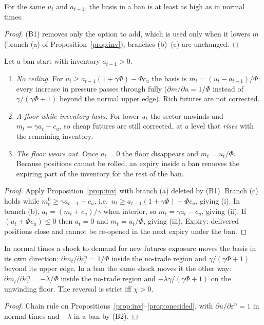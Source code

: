 \begin{lemma}\label{lem:weak}
For the same $u_t$ and $a_{t-1}$, the basis in a ban is at least as high as in normal times.
\end{lemma}
\begin{proof}
(B1) removes only the option to add, which is used only when it lowers $m$ (branch (a) of Proposition~\ref{prop:inv});
branches (b)--(c) are unchanged.
\end{proof}

\begin{proposition}\label{prop:onesided}
Let a ban start with inventory $a_{t-1}>0$.
\begin{enumerate}[label=(\roman*),leftmargin=1.8em,itemsep=1pt]
\item \emph{No ceiling.} For $u_t\ge a_{t-1}(1+\gamma\Phi)-\Phi c_u$ the basis is $m_t=(u_t-a_{t-1})/\Phi$: every increase
in pressure passes through fully ($\partial m/\partial u=1/\Phi$ instead of $\gamma/(\gamma\Phi+1)$ beyond the normal
upper edge). Rich futures are not corrected.
\item \emph{A floor while inventory lasts.} For lower $u_t$ the sector unwinds and $m_t=\gamma a_t-c_u$, so cheap futures
are still corrected, at a level that \emph{rises} with the remaining inventory.
\item \emph{The floor wears out.} Once $a_t=0$ the floor disappears and $m_t=u_t/\Phi$. Because positions cannot be rolled,
an expiry inside a ban removes the expiring part of the inventory for the rest of the ban.
\end{enumerate}
\end{proposition}
\begin{proof}
Apply Proposition~\ref{prop:inv} with branch (a) deleted by (B1). Branch (c) holds while
$m^0_t\ge\gamma a_{t-1}-c_u$, i.e.\ $u_t\ge a_{t-1}(1+\gamma\Phi)-\Phi c_u$, giving (i). In branch (b), $a_t=(m_t+c_u)/\gamma$
when interior, so $m_t=\gamma a_t-c_u$, giving (ii). If $(u_t+\Phi c_u)\le 0$ then $a_t=0$ and $m_t=u_t/\Phi$, giving
(iii). Expiry: delivered positions close and cannot be re-opened in the next expiry under the ban.
\end{proof}

\begin{proposition}\label{prop:flip}
In normal times a shock to demand for new futures exposure moves the basis in its own direction:
$\partial m_t/\partial\varepsilon^n_t=1/\Phi$ inside the no-trade region and $\gamma/(\gamma\Phi+1)$ beyond its upper edge.
In a ban the same shock moves it the other way: $\partial m_t/\partial\varepsilon^n_t=-\lambda/\Phi$ inside the no-trade
region and $-\lambda\gamma/(\gamma\Phi+1)$ on the unwinding floor. The reversal is strict iff $\chi>0$.
\end{proposition}
\begin{proof}
Chain rule on Propositions~\ref{prop:inv}--\ref{prop:onesided}, with $\partial u/\partial\varepsilon^n=1$ in normal times and
$-\lambda$ in a ban by (B2).
\end{proof}

